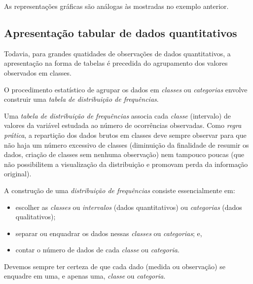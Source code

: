 \documentclass[
]{book}
\providecommand{\tightlist}{%
  \setlength{\itemsep}{0pt}\setlength{\parskip}{0pt}}
\begin{document}
As representações gráficas são análogas às mostradas no exemplo anterior.

\hypertarget{apresentauxe7uxe3o-tabular-de-dados-quantitativos}{%
\subsection{Apresentação tabular de dados quantitativos}\label{apresentauxe7uxe3o-tabular-de-dados-quantitativos}}

\hfill\break

Todavia, para grandes quatidades de observações de dados quantitativos, a apresentação na forma de tabelas é precedida do agrupamento dos valores observados em classes.

\hfill\break

O procedimento estatístico de agrupar os dados em \emph{classes} ou \emph{categorias} envolve construir uma \emph{tabela de distribuição de frequências}.

\hfill\break

Uma \emph{tabela de distribuição de frequências} associa cada \emph{classe} (intervalo) de valores da variável estudada ao número de ocorrências observadas. Como \emph{regra prática}, a repartição dos dados brutos em classes deve sempre observar para que não haja um número excessivo de classes (diminuição da finalidade de resumir os dados, criação de classes sem nenhuma observação) nem tampouco poucas (que não possibilitem a visualização da distribuição e promovam perda da informação original).

\hfill\break

A construção de uma \emph{distribuição de frequências} consiste essencialmente em:

\hfill\break

\begin{itemize}
\tightlist
\item
  escolher as \emph{classes} ou \emph{intervalos} (dados quantitativos) ou \emph{categorias} (dados qualitativos);
\item
  separar ou enquadrar os dados nessas \emph{classes} ou \emph{categorias}; e,
\item
  contar o número de dados de cada \emph{classe} ou \emph{categoria}.
\end{itemize}

\hfill\break

Devemos sempre ter certeza de que cada dado (medida ou observação) se enquadre em uma, e apenas uma, \emph{classe} ou \emph{categoria}.
\end{document}
